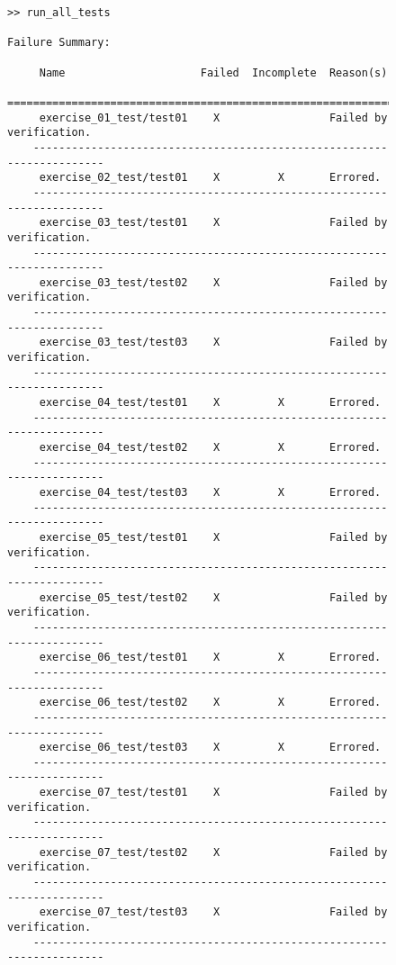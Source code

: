 \begin{figure}
\begin{lstlisting}[basicstyle=\scriptsize]
>> run_all_tests

Failure Summary:

     Name                     Failed  Incomplete  Reason(s)
    ======================================================================
     exercise_01_test/test01    X                 Failed by verification.
    ----------------------------------------------------------------------
     exercise_02_test/test01    X         X       Errored.
    ----------------------------------------------------------------------
     exercise_03_test/test01    X                 Failed by verification.
    ----------------------------------------------------------------------
     exercise_03_test/test02    X                 Failed by verification.
    ----------------------------------------------------------------------
     exercise_03_test/test03    X                 Failed by verification.
    ----------------------------------------------------------------------
     exercise_04_test/test01    X         X       Errored.
    ----------------------------------------------------------------------
     exercise_04_test/test02    X         X       Errored.
    ----------------------------------------------------------------------
     exercise_04_test/test03    X         X       Errored.
    ----------------------------------------------------------------------
     exercise_05_test/test01    X                 Failed by verification.
    ----------------------------------------------------------------------
     exercise_05_test/test02    X                 Failed by verification.
    ----------------------------------------------------------------------
     exercise_06_test/test01    X         X       Errored.
    ----------------------------------------------------------------------
     exercise_06_test/test02    X         X       Errored.
    ----------------------------------------------------------------------
     exercise_06_test/test03    X         X       Errored.
    ----------------------------------------------------------------------
     exercise_07_test/test01    X                 Failed by verification.
    ----------------------------------------------------------------------
     exercise_07_test/test02    X                 Failed by verification.
    ----------------------------------------------------------------------
     exercise_07_test/test03    X                 Failed by verification.
    ----------------------------------------------------------------------

\end{lstlisting}
\end{figure}
